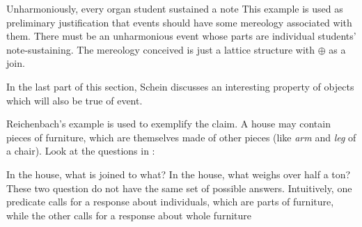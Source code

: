  \ex
 Unharmoniously, every organ student sustained a note
 \xe
 This example is used as preliminary justification that events should have some mereology associated with them. There must be an unharmonious event whose parts are individual students' note-sustaining. The mereology conceived is just a lattice structure with $\oplus$ as a join.

 In the last part of this section, Schein discusses an interesting property of objects which will also be true of event. 

 \begin{center}
 \end{center}

 Reichenbach's example is used to exemplify the claim. A house may contain pieces of furniture, which are themselves made of other pieces (like \emph{arm} and \emph{leg} of a chair). Look at the questions in \cnextx:

 \pex
 \a 
 In the house, what is joined to what?
 \a 
 In the house, what weighs over half a ton?
 \xe
 These two question do not have the same set of possible answers. Intuitively, one predicate calls for a response about individuals, which are parts of furniture, while the other calls for a response about whole furniture



